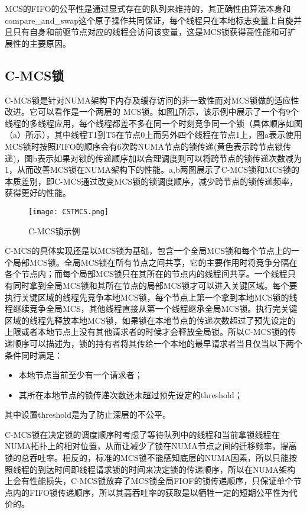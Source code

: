 MCS的FIFO的公平性是通过显式存在的队列来维持的，其正确性由算法本身和compare\_and\_swap这个原子操作共同保证，每个线程只在本地标志变量上自旋并且只有自身和前驱节点对应的线程会访问该变量，这是MCS锁获得高性能和可扩展性的主要原因。

\subsection{C-MCS锁}
C-MCS锁是针对NUMA架构下内存及缓存访问的非一致性而对MCS锁做的适应性改进。它可以看作是一个两层的 MCS锁。如图\ref{Fig:CSTMCS}所示，该示例中展示了一个有9个线程的多线程应用，每个线程都差不多在同一个时刻竞争同一个锁（具体顺序如图（a）所示），其中线程T1到T5在节点0上而另外四个线程在节点1上，图a表示使用MCS锁时按照FIFO的顺序会有6次跨NUMA节点的锁传递(黄色表示跨节点锁传递)，图b表示如果对锁的传递顺序加以合理调度则可以将跨节点的锁传递次数减为1，从而改善MCS锁在NUMA架构下的性能。a,b两图展示了C-MCS锁和MCS锁的本质差别，即C-MCS通过改变MCS锁的锁调度顺序，减少跨节点的锁传递频率，获得更好的性能。
\begin{figure}[t]
	\centering
	\texttt{[image: CSTMCS.png]}
	\caption{C-MCS锁示例}
	\label{Fig:CSTMCS}
\end{figure}
C-MCS的具体实现还是以MCS锁为基础，包含一个全局MCS锁和每个节点上的一个局部MCS锁。全局MCS锁在所有节点之间共享，它的主要作用时将竞争分隔在各个节点内；而每个局部MCS锁只在其所在的节点内的线程间共享。一个线程只有同时拿到全局MCS锁和其所在节点的局部MCS锁才可以进入关键区域。每个要执行关键区域的线程先竞争本地MCS锁，每个节点上第一个拿到本地MCS锁的线程继续竞争全局MCS，其他线程直接从第一个线程继承全局MCS锁。执行完关键区域的线程先释放本地MCS锁，如果锁在本地节点的传递次数超过了预先设定的上限或者本地节点上没有其他请求者的时候才会释放全局锁。所以C-MCS锁的传递顺序可以描述为，锁的持有者将其传给一个本地的最早请求者当且仅当以下两个条件同时满足：
\begin{itemize}
\item  本地节点当前至少有一个请求者；
\item  其所在本地节点的锁传递次数还未超过预先设定的threshold；
\end{itemize}
其中设置threshold是为了防止深层的不公平。

C-MCS锁在决定锁的调度顺序时考虑了等待队列中的线程和当前拿锁线程在NUMA拓扑上的相对位置，从而让减少了锁在NUMA节点之间的迁移频率，提高锁的总吞吐率。相反的，标准的MCS锁不能感知底层的NUMA因素，所以只能按照线程的到达时间即线程请求锁的时间来决定锁的传递顺序，所以在NUMA架构上会有性能损失，C-MCS锁放弃了MCS锁全局FIOF的锁传递顺序，只保证单个节点内的FIFO锁传递顺序，所以其高吞吐率的获取是以牺牲一定的短期公平性为代价的。

